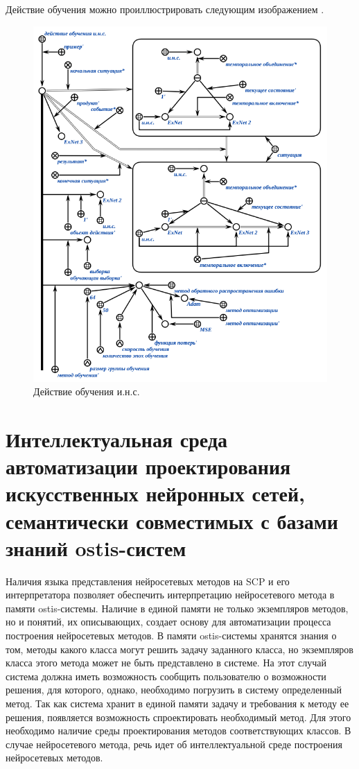 Действие обучения  можно проиллюстрировать следующим изображением \textit{}.

\begin{figure}[H]
	\includegraphics[scale=0.8]{author/part3/figures/ann_training_nn_scg.png}
	\caption{Действие обучения и.н.с.}
	\label{fig:ann_training_nn_scg}
\end{figure}

\section{Интеллектуальная среда автоматизации проектирования искусственных нейронных сетей, семантически совместимых с базами знаний ostis-систем}

Наличия языка представления нейросетевых методов на SCP и его интерпретатора позволяет обеспечить интерпретацию нейросетевого метода в памяти ostis-системы. Наличие в единой памяти не только экземпляров методов, но и понятий, их описывающих, создает основу для автоматизации процесса построения нейросетевых методов. В памяти ostis-системы хранятся знания о том, методы какого класса могут решить задачу заданного класса, но экземпляров класса этого метода может не быть представлено в системе. На этот случай система должна иметь возможность сообщить пользователю о возможности решения, для которого, однако, необходимо погрузить в систему определенный метод. Так как система хранит в единой памяти задачу и требования к методу ее решения, появляется возможность спроектировать необходимый метод. Для этого необходимо наличие среды проектирования методов соответствующих классов. В случае нейросетевого метода, речь идет об интеллектуальной среде построения нейросетевых методов.

